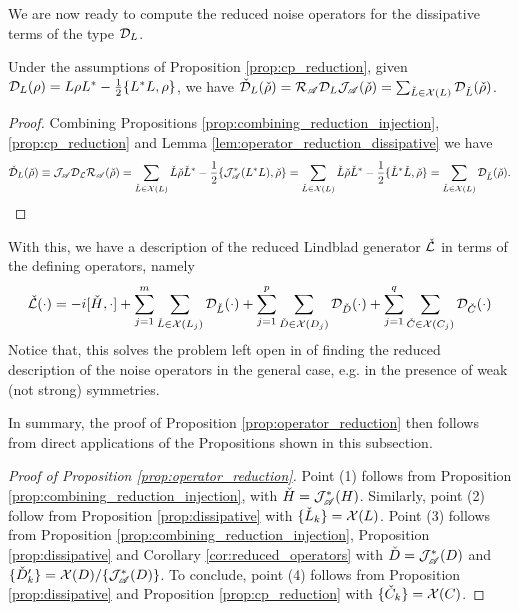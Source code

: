 \documentclass[aihp,12pt]{imsart}
\begin{document}
We are now ready to compute the reduced noise operators for the dissipative terms of the type $\mathcal{D}_{L}$. 
\begin{proposition}
\label{prop:dissipative}
    Under the assumptions of Proposition \ref{prop:cp_reduction}, given $\mathcal{D}_{L}(\rho) = L\rho L^* -\frac{1}{2}\{L^* L, \rho\}$, we have $\check{\mathcal{D}}_{L}(\check{\rho}) = \mathcal{R}_{\mathscr{A}} \mathcal{D}_L \mathcal{J}_{\mathscr{A}}(\check{\rho}) = \sum_{\check{L}\in\mathcal{X}(L)} \mathcal{D}_{\check{L}}(\check{\rho})$. 
\end{proposition}
\begin{proof}
    Combining Propositions \ref{prop:combining_reduction_injection}, \ref{prop:cp_reduction} and Lemma \ref{lem:operator_reduction_dissipative} we have \[\check{\mathcal{D}}_{L}(\check{\rho})\equiv \mathcal{J}_{\mathscr{A}} \mathcal{D}_{\mathcal{L}} \mathcal{R}_{\mathscr{A}} (\check{\rho}) = \sum_{\check{L}\in\mathcal{X}(L)} \check{L}\check{\rho}\check{L}^* -\frac{1}{2}\{\mathcal{J}_{\mathscr{A}}^*(L^* L),\check{\rho}\} = \sum_{\check{L}\in\mathcal{X}(L)} \check{L}\check{\rho}\check{L}^* -\frac{1}{2}\{\check{L}^* \check{L},\check{\rho}\} = \sum_{\check{L}\in\mathcal{X}(L)} \mathcal{D}_{\check{L}}(\check{\rho}).\]
\end{proof}
With this, we have a description of the reduced Lindblad generator $\check{\mathcal{L}}$ in terms of the defining operators, namely 
\begin{equation}
    \check{\mathcal{L}}(\cdot) = -i [\check{H},\cdot] + \sum_{j=1}^m \sum_{\check{L}\in\mathcal{X}(L_j)} \mathcal{D}_{\check{L}}(\cdot) + \sum_{j=1}^p \sum_{\check{D}\in\mathcal{X}(D_j)} \mathcal{D}_{\check{D}}(\cdot) + \sum_{j=1}^q \sum_{\check{C}\in\mathcal{X}(C_j)} \mathcal{D}_{\check{C}}(\cdot)
\end{equation}
Notice that, this solves the problem left open in \cite{prxq2024} of finding the reduced description of the noise operators in the general case, e.g. in the presence of weak (not strong) symmetries. 

In summary, the proof of Proposition \ref{prop:operator_reduction} then follows from direct applications of the Propositions shown in this subsection.
\begin{proof}[Proof of Proposition \ref{prop:operator_reduction}]
    Point (1) follows from Proposition \ref{prop:combining_reduction_injection}, with $\check{H} = \mathcal{J}_{\mathscr{A}}^*(H)$. Similarly, point (2) follow from Proposition \ref{prop:dissipative} with $\{\check{L}_k\} = \mathcal{X}(L)$.
    Point (3) follows from Proposition \ref{prop:combining_reduction_injection}, Proposition \ref{prop:dissipative} and Corollary \ref{cor:reduced_operators} with $\check{D} = \mathcal{J}_{\mathscr{A}}^*(D)$ and $\{\check{D}'_k\} = \mathcal{X}(D)/\{\mathcal{J}_{\mathscr{A}}^*(D)\}$. 
    To conclude, point (4) follows from Proposition \ref{prop:dissipative} and Proposition \ref{prop:cp_reduction} with $\{\check{C}_k\} = \mathcal{X}(C)$.
\end{proof}
\end{document}
